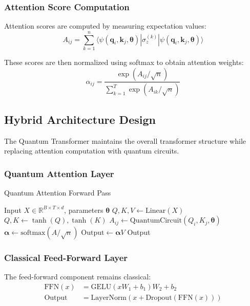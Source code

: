 \documentclass[11pt,twocolumn]{article}
\begin{document}
\subsubsection{Attention Score Computation}

Attention scores are computed by measuring expectation values:
\begin{equation}
A_{ij} = \sum_{k=1}^{n} \langle \psi(\mathbf{q}_i, \mathbf{k}_j, \boldsymbol{\theta}) | \sigma_z^{(k)} | \psi(\mathbf{q}_i, \mathbf{k}_j, \boldsymbol{\theta}) \rangle
\end{equation}

These scores are then normalized using softmax to obtain attention weights:
\begin{equation}
\alpha_{ij} = \frac{\exp(A_{ij}/\sqrt{n})}{\sum_{k=1}^{T} \exp(A_{ik}/\sqrt{n})}
\end{equation}

\subsection{Hybrid Architecture Design}

The Quantum Transformer maintains the overall transformer structure while replacing attention computation with quantum circuits.

\subsubsection{Quantum Attention Layer}
\begin{algorithm}[H]
\caption{Quantum Attention Forward Pass}
\begin{algorithmic}[1]
\REQUIRE Input $X \in \mathbb{R}^{B \times T \times d}$, parameters $\boldsymbol{\theta}$
\STATE $Q, K, V \leftarrow \text{Linear}(X)$
\STATE $Q, K \leftarrow \tanh(Q), \tanh(K)$ 
        \STATE $A_{ij} \leftarrow \text{QuantumCircuit}(Q_i, K_j, \boldsymbol{\theta})$
    \ENDFOR
\ENDFOR
\STATE $\boldsymbol{\alpha} \leftarrow \text{softmax}(A/\sqrt{n})$
\STATE $\text{Output} \leftarrow \boldsymbol{\alpha} V$
\RETURN Output
\end{algorithmic}
\end{algorithm}

\subsubsection{Classical Feed-Forward Layer}
The feed-forward component remains classical:
\begin{align}
\text{FFN}(x) &= \text{GELU}(xW_1 + b_1)W_2 + b_2\\
\text{Output} &= \text{LayerNorm}(x + \text{Dropout}(\text{FFN}(x)))
\end{align}
\end{document}
